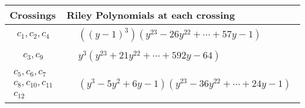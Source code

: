 \documentclass[1p]{elsarticle_modified}
\theoremstyle{definition}
\begin{document}
\begin{tabular}{m{50pt}|m{274pt}}
Crossings & \hspace{64pt}Riley Polynomials at each crossing \\
\hline $$\begin{aligned}c_{1},c_{2},c_{4}\end{aligned}$$&$\begin{aligned}
&((y-1)^3)(y^{23}-26 y^{22}+\cdots+57 y-1)
\end{aligned}$\\
\hline $$\begin{aligned}c_{3},c_{9}\end{aligned}$$&$\begin{aligned}
&y^3(y^{23}+21 y^{22}+\cdots+592 y-64)
\end{aligned}$\\
\hline $$\begin{aligned}c_{5},c_{6},c_{7}\\c_{8},c_{10},c_{11}\\c_{12}\end{aligned}$$&$\begin{aligned}
&(y^3-5 y^2+6 y-1)(y^{23}-36 y^{22}+\cdots+24 y-1)
\end{aligned}$\\
\hline
\end{tabular}
\vskip 2pc
\end{document}
